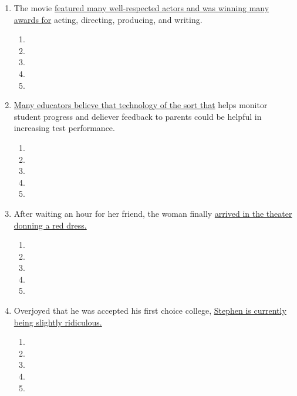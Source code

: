 \begin{enumerate}
\begin{enumerate}
\bigskip
\item The movie \ul{featured many well-respected actors and was winning many awards for} acting, directing, producing, and writing. 

\bigskip
\begin{enumerate}[label=(\Alph*)]
\item\hrulefill
\item\hrulefill
\item\hrulefill
\item\hrulefill
\item\hrulefill
\end{enumerate}

\bigskip
\item \ul{Many educators believe that technology of the sort that} helps monitor student progress and deliever feedback to parents could be helpful in increasing test performance. 

\bigskip
\begin{enumerate}[label=(\Alph*)]
\item\hrulefill
\item\hrulefill
\item\hrulefill
\item\hrulefill
\item\hrulefill
\end{enumerate}

\bigskip
\item After waiting an hour for her friend, the woman finally \ul{arrived in the theater donning a red dress.}

\bigskip
\begin{enumerate}[label=(\Alph*)]
\item\hrulefill
\item\hrulefill
\item\hrulefill
\item\hrulefill
\item\hrulefill
\end{enumerate}

\bigskip
\item Overjoyed that he was accepted his first choice college, \ul{Stephen is currently being slightly ridiculous.}

\bigskip
\begin{enumerate}[label=(\Alph*)]
\item\hrulefill
\item\hrulefill
\item\hrulefill
\item\hrulefill
\item\hrulefill
\end{enumerate}


\end{enumerate}
\end{enumerate}

